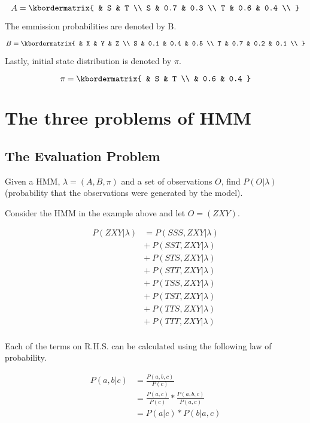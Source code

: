 \documentclass[11pt, a4paper]{article}
\begin{document}
\[
	A = \kbordermatrix{
		& S & T \\
		S & 0.7 & 0.3 \\
		T & 0.6 & 0.4 \\
	}
\]

The emmission probabilities are denoted by B.

\[
	B = \kbordermatrix{
		& X & Y & Z \\
		S & 0.1 & 0.4 & 0.5 \\
		T & 0.7 & 0.2 & 0.1 \\
	}
\]

Lastly, initial state distribution is denoted by $\pi$.

\[
	\pi = \kbordermatrix{
		& S & T \\
		& 0.6 & 0.4  
	}
\]

\section{The three problems of HMM}

\subsection{The Evaluation Problem}

Given a HMM, $\lambda=(A, B, \pi)$ and a set of observations $O$, find $P(O|\lambda)$ (probability that the observations were generated by the model).

Consider the HMM in the example above and let $O = (ZXY)$.

\begin{align*}
	P(ZXY|\lambda) & = P(SSS, ZXY|\lambda)  \\
	               & +\ P(SST, ZXY|\lambda) \\
	               & +\ P(STS, ZXY|\lambda) \\
	               & +\ P(STT, ZXY|\lambda) \\
	               & +\ P(TSS, ZXY|\lambda) \\
	               & +\ P(TST, ZXY|\lambda) \\
	               & +\ P(TTS, ZXY|\lambda) \\
	               & +\ P(TTT, ZXY|\lambda) \\  
\end{align*}

Each of the terms on R.H.S. can be calculated using the following law of probability.

\begin{align*}
	P(a, b|c) & = \frac{P(a, b, c) }{P(c)}                            \\ 
	          & = \frac{P(a, c) }{P(c)} * \frac{P(a, b, c) }{P(a, c)} \\
	          & = P(a|c) * P(b|a,c)                                   
\end{align*} 
\end{document}
